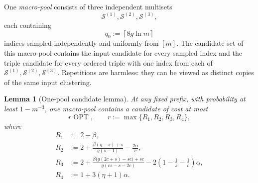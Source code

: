 \documentclass[11pt]{article}
\newtheorem{lemma}[theorem]{Lemma}
\theoremstyle{definition}
\theoremstyle{remark}
\newcommand{\Sset}{\mathcal S}
\newcommand{\OPT}{\operatorname{OPT}}
\newcommand{\1}{\mathbf 1}
\begin{document}
One \emph{macro-pool} consists of three independent multisets
\[
  \Sset^{(1)},\Sset^{(2)},\Sset^{(3)},
\]
each containing
\begin{equation}\label{eq:q0-definition}
  q_0:=\left\lceil8g\ln m\right\rceil
\end{equation}
indices sampled independently and uniformly from $[m]$.  The candidate set
of this macro-pool contains the input candidate for every sampled index and
the triple candidate for every ordered triple with one index from each of
$\Sset^{(1)},\Sset^{(2)},\Sset^{(3)}$.  Repetitions are harmless: they can be
viewed as distinct copies of the same input clustering.

\begin{lemma}[One-pool candidate lemma]\label{lem:one-pool}
At any fixed prefix, with probability at least $1-m^{-3}$, one macro-pool
contains a candidate of cost at most
\begin{equation}\label{eq:r-general}
 r\OPT,
 \qquad
 r:=\max\{R_1,R_2,R_3,R_4\},
\end{equation}
where
\begin{align}
 R_1&:=2-\beta,\label{eq:R1-definition}\\
 R_2&:=2+\frac{\beta(g-s)+s}{g(s-1)}-\frac{2\alpha}{c},
       \label{eq:R2-definition}\\
 R_3&:=2+
 \frac{\beta\bigl(g(2c+s)-sc\bigr)+sc}
      {g(cs-s-2c)}
 -2\left(1-\frac1s-\frac1c\right)\alpha,
       \label{eq:R3-definition-again}\\
 R_4&:=1+3(\eta+1)\alpha.\label{eq:R4-definition}
\end{align}
\end{lemma}
\end{document}
